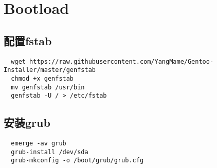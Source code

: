 \chapter{Bootload}
\section{配置fstab}


\begin{lstlisting}
  wget https://raw.githubusercontent.com/YangMame/Gentoo-Installer/master/genfstab
  chmod +x genfstab
  mv genfstab /usr/bin
  genfstab -U / > /etc/fstab 
\end{lstlisting}

\section{安装grub}

\begin{lstlisting}
  emerge -av grub
  grub-install /dev/sda
  grub-mkconfig -o /boot/grub/grub.cfg
\end{lstlisting}

